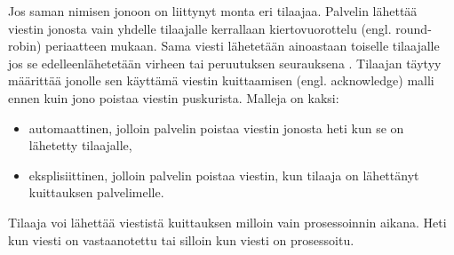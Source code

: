 Jos saman nimisen jonoon on liittynyt monta eri tilaajaa. Palvelin lähettää viestin jonosta vain yhdelle tilaajalle kerrallaan kiertovuorottelu (engl. round-robin) periaatteen mukaan. Sama viesti lähetetään ainoastaan toiselle tilaajalle jos se edelleenlähetetään virheen tai peruutuksen seurauksena \mbox{\cite[s.~11--12]{AMQP-specification}}. Tilaajan täytyy määrittää jonolle sen käyttämä viestin kuittaamisen (engl. acknowledge) malli ennen kuin jono poistaa viestin puskurista. Malleja on kaksi:
\begin{itemize}
	\item automaattinen, jolloin palvelin poistaa viestin jonosta heti kun se on lähetetty tilaajalle,
	\item eksplisiittinen, jolloin palvelin poistaa viestin, kun tilaaja on lähettänyt kuittauksen palvelimelle.
\end{itemize}
Tilaaja voi lähettää viestistä kuittauksen milloin vain prosessoinnin aikana. Heti kun viesti on vastaanotettu tai silloin kun viesti on prosessoitu. \mbox{\cite[s.~29]{AMQP-specification}}